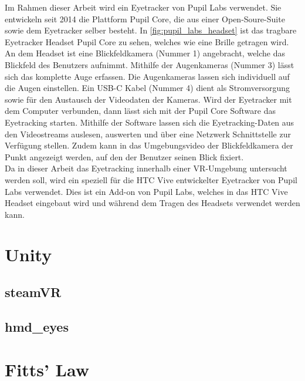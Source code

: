 
Im Rahmen dieser Arbeit wird ein Eyetracker von Pupil Labs verwendet. Sie entwickeln seit 2014 die Plattform Pupil Core, die aus einer Open-Soure-Suite sowie dem Eyetracker selber besteht. In \autoref{fig:pupil_labs_headset} ist das tragbare Eyetracker Headset Pupil Core zu sehen, welches wie eine Brille getragen wird. An dem Headset ist eine Blickfeldkamera (Nummer 1) angebracht, welche das Blickfeld des Benutzers aufnimmt. Mithilfe der Augenkameras (Nummer 3) lässt sich das komplette Auge erfassen. Die Augenkameras lassen sich individuell auf die Augen einstellen. Ein USB-C Kabel (Nummer 4) dient als Stromversorgung sowie für den Austausch der Videodaten der Kameras. Wird der Eyetracker mit dem Computer verbunden, dann lässt sich mit der Pupil Core Software das Eyetracking starten. Mithilfe der Software lassen sich die Eyetracking-Daten aus den Videostreams auslesen, auswerten und über eine Netzwerk Schnittstelle zur Verfügung stellen. Zudem kann in das Umgebungsvideo der Blickfeldkamera der Punkt angezeigt werden, auf den der Benutzer seinen Blick fixiert. \\
Da in dieser Arbeit das Eyetracking innerhalb einer \ac{VR}-Umgebung untersucht werden soll, wird ein speziell für die HTC Vive entwickelter Eyetracker von Pupil Labs verwendet. Dies ist ein Add-on von Pupil Labs, welches in das HTC Vive Headset eingebaut wird und während dem Tragen des Headsets verwendet werden kann.


\cite{PaperPupilLabs}

\section{Unity}

\subsection{steamVR}

\subsection{hmd\_eyes}

\section{Fitts' Law}